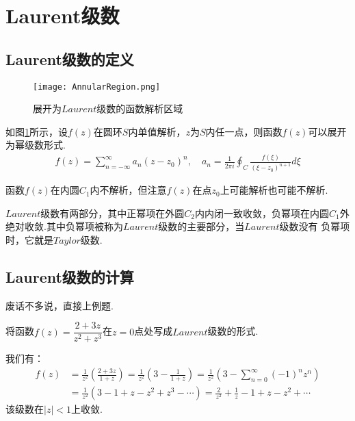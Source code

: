 \section{Laurent级数}
    \subsection{Laurent级数的定义}
        \begin{figure}
            \centering
            \texttt{[image: AnnularRegion.png]}
            \caption{展开为$Laurent$级数的函数解析区域}
            \label{fig:Laurent_series}
        \end{figure}
        \begin{definition}[Laurent级数]\label{def:laurent_series}
            如图\ref{fig:Laurent_series}所示，设$f(z)$在圆环$S$内单值解析，$z$为$S$内任一点，则函数$f(z)$可以展开为幂级数形式.
            \begin{align*}
                f(z)=\sum_{n=-\infty}^{\infty}a_n(z-z_0)^n,\quad a_n=\frac{1}{2\pi i}\oint_{C}\frac{f(\xi)}{(\xi-z_0)^{n+1}}d\xi
            \end{align*}
        \end{definition}
        函数$f(z)$在内圆$C_1$内不解析，但注意$f(z)$在点$z_0$上可能解析也可能不解析.

        $Laurent$级数有两部分，其中正幂项在外圆$C_2$内内闭一致收敛，负幂项在内圆$C_1$外绝对收敛.其中负幂项被称为$Laurent$级数的主要部分，当$Laurent$级数没有
        负幂项时，它就是$Taylor$级数.


    \subsection{Laurent级数的计算}
        废话不多说，直接上例题.
        \begin{example}
            将函数$f(z)=\dfrac{2+3z}{z^2+z^3}$在$z=0$点处写成$Laurent$级数的形式.
        \end{example}
        \begin{solution}
            我们有：
            \begin{align*}
                f(z)&=\frac{1}{z^2}\left(\frac{2+3z}{1+z}\right)=\frac{1}{z^2}\left(3-\frac{1}{1+z}\right)
                =\frac{1}{z^2}\left(3-\sum_{n=0}^{\infty}(-1)^nz^n\right)\\
                &=\frac{1}{z^2}(3-1+z-z^2+z^3-\cdots)=\frac{2}{z^2}+\frac{1}{z}-1+z-z^2+\cdots
            \end{align*}
            该级数在$|z|<1$上收敛.
        \end{solution}

